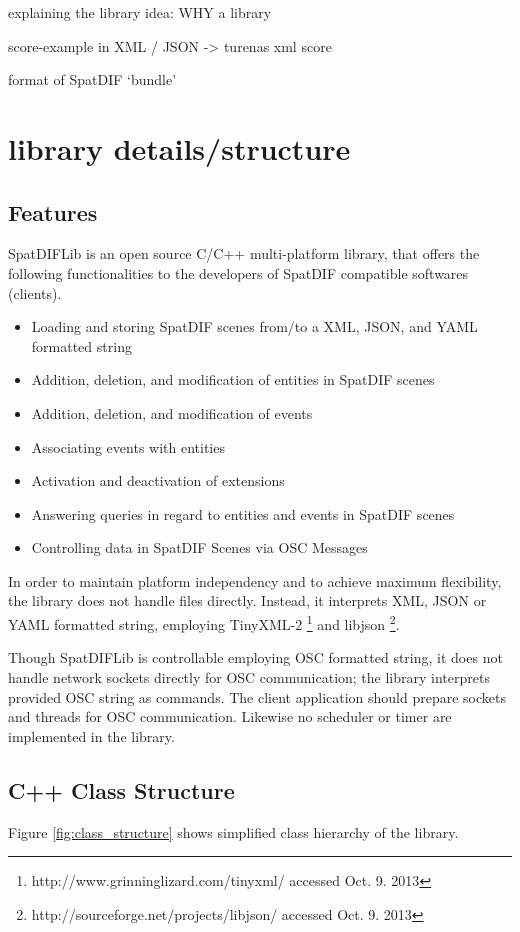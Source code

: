 \documentclass[a4paper]{article}
\begin{document}
explaining the library idea: WHY a library

score-example in XML / JSON -> turenas xml score

format of SpatDIF `bundle'


\section{library details/structure} %

\subsection{Features}
SpatDIFLib is an open source C/C++ multi-platform library, that offers the following functionalities to the developers of SpatDIF compatible softwares (clients).

\begin{itemize}
\item Loading and storing SpatDIF scenes from/to a XML, JSON, and YAML formatted string
\item Addition, deletion, and modification of entities in SpatDIF scenes
\item Addition, deletion, and modification of events
\item Associating events with entities
\item Activation and deactivation of extensions
\item Answering queries in regard to entities and events in SpatDIF scenes
\item Controlling data in SpatDIF Scenes via OSC Messages
\end{itemize}

In order to maintain platform independency and to achieve maximum flexibility, the library does not handle files directly. Instead, it interprets XML, JSON or YAML formatted string, employing TinyXML-2 \footnote{http://www.grinninglizard.com/tinyxml/ accessed Oct. 9. 2013} and libjson \footnote{http://sourceforge.net/projects/libjson/ accessed Oct. 9. 2013}.
  
  Though SpatDIFLib is controllable employing OSC formatted string, it does not handle network sockets directly for OSC communication; the library  interprets provided OSC string as commands. The client application should prepare sockets and threads for OSC communication. Likewise no scheduler or timer are implemented in the library. 
  
\subsection{C++ Class Structure}
Figure \ref{fig:class_structure} shows simplified class hierarchy of the library. 
\end{document}
